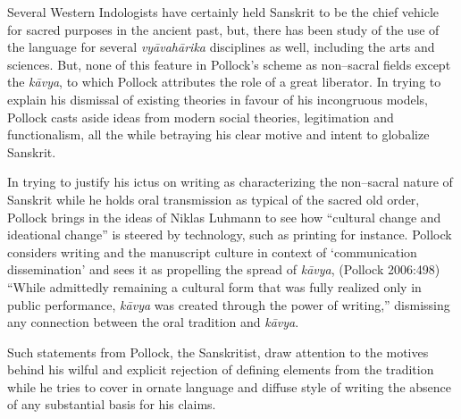 Several Western Indologists have certainly held Sanskrit to be the chief vehicle for sacred purposes in the ancient past, but, there has been study of the use of the language for several \textit{vyāvahārika} disciplines as well, including the arts and sciences. But, none of this feature in Pollock’s scheme as non–sacral fields except the \textit{kāvya}, to which Pollock attributes the role of a great liberator. In trying to explain his dismissal of existing theories in favour of his incongruous models, Pollock casts aside ideas from modern social theories, legitimation and functionalism, all the while betraying his clear motive and intent to globalize Sanskrit.

In trying to justify his ictus on writing as characterizing the non–sacral nature of Sanskrit while he holds oral transmission as typical of the sacred old order, Pollock brings in the ideas of Niklas Luhmann to see how “cultural change and ideational change” is steered by technology, such as printing for instance. Pollock considers writing and the manuscript culture in context of ‘communication dissemination’ and sees it as propelling the spread of \textit{kāvya}, (Pollock 2006:498) “While admittedly remaining a cultural form that was fully realized only in public performance, \textit{kāvya} was created through the power of writing,” dismissing any connection between the oral tradition and \textit{kāvya}.

Such statements from Pollock, the Sanskritist, draw attention to the motives behind his wilful and explicit rejection of defining elements from the tradition while he tries to cover in ornate language and diffuse style of writing the absence of any substantial basis for his claims.

